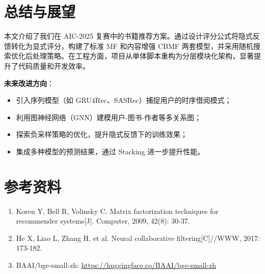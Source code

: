 \documentclass[12pt,a4paper]{article}
\begin{document}
\section{总结与展望}

本文介绍了我们在 AIC-2025 复赛中的书籍推荐方案。通过设计评分公式将隐式反馈转化为显式评分，构建了标准 MF 和内容增强 CBMF 两套模型，并采用随机搜索优化后处理策略。在工程方面，项目从单体脚本重构为分层模块化架构，显著提升了代码质量和开发效率。

\textbf{未来改进方向}：

\begin{itemize}[leftmargin=2em]
    \item 引入序列模型（如 GRU4Rec、SASRec）捕捉用户的时序借阅模式；
    \item 利用图神经网络（GNN）建模用户-图书-作者等多关系图；
    \item 探索负采样策略的优化，提升隐式反馈下的训练效果；
    \item 集成多种模型的预测结果，通过 Stacking 进一步提升性能。
\end{itemize}

\section*{参考资料}

\begin{enumerate}[leftmargin=2em]
    \item Koren Y, Bell R, Volinsky C. Matrix factorization techniques for recommender systems[J]. Computer, 2009, 42(8): 30-37.
    \item He X, Liao L, Zhang H, et al. Neural collaborative filtering[C]//WWW, 2017: 173-182.
    \item BAAI/bge-small-zh: \url{https://huggingface.co/BAAI/bge-small-zh}
\end{enumerate}
\end{document}
